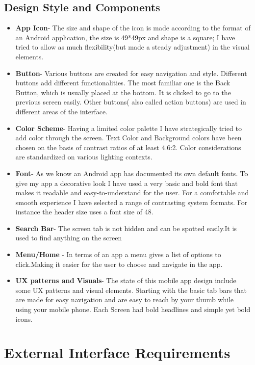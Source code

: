 \documentclass{article}
\begin{document}
\subsection{Design Style and Components}
\begin{itemize}
    \item \textbf{App Icon}- The size and shape of the icon is made according to the format of an Android application, the size is 49*49px and shape is a square; I have tried to allow as much flexibility(but made a  steady adjustment) in the visual elements. 
    \item \textbf{Button}- Various buttons are created for easy navigation and style. Different buttons add different functionalities. The most familiar one is the Back Button, which is usually placed at the bottom. It is clicked to go to the previous screen easily. Other buttons( also called action buttons) are used in different areas of the interface.
    \item \textbf{Color Scheme}- Having a limited color palette I have strategically tried to add color through the screen. Text Color and Background colors have been chosen on the basis of contrast ratios of at least 4.6:2. Color considerations are standardized on various lighting contexts.
    \item \textbf{Font}- As we know an Android app has documented its own default fonts. To give my app a decorative look I have used a very basic and bold font that makes it readable and easy-to-understand for the user. For a comfortable and smooth experience I have selected a range of contrasting system formats. For instance the header size uses a font size of 48.
    \item \textbf{Search Bar}- The screen tab is not hidden and can be spotted easily.It is used to find anything on the screen
    \item \textbf{Menu/Home} - In terms of an app a menu gives a list of options to click.Making it easier for the user to choose and navigate in the app.
    \item \textbf{UX patterns and Visuals}- The state of this mobile app design include some UX patterns and visual elements. Starting with the basic tab bars that are made for  easy navigation and are easy to reach by your thumb while using your mobile phone. Each Screen had bold headlines and simple yet bold icons.
\end{itemize}

\section{External Interface Requirements}
\end{document}
